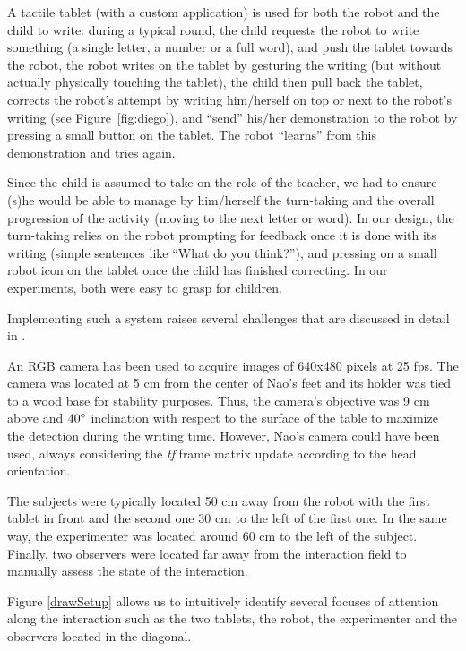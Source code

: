 \documentclass{sig-alternate}
\begin{document}
A tactile tablet (with a custom application) is used for both the robot and the child to write: during a typical round, the child requests the robot to write something (a single letter, a number or a full word), and push the tablet towards the robot, the robot writes on the tablet by gesturing the writing (but without actually physically touching the tablet), the child then pull back the
tablet, corrects the robot's attempt by writing him/herself on top or next to the robot's writing (see Figure~\ref{fig:diego}), and ``send'' his/her demonstration to the robot by pressing a small button on the tablet. The robot ``learns'' from this demonstration and tries again.

Since the child is assumed to take on the role of the teacher, we had to ensure (s)he would be able to manage by him/herself the turn-taking and the overall progression of the activity (moving to the next letter or word). In our design, the turn-taking relies on the robot prompting for feedback once it is done with its writing (simple sentences like ``What do you think?''), and pressing on a
small robot icon on the tablet once the child has finished correcting. In our experiments, both were easy to grasp for children.

Implementing such a system raises several challenges that are discussed in detail in \cite{Hood:2015}.

An RGB camera has been used to acquire images of 640x480 pixels at 25 fps. The camera was located at 5 cm from the center of Nao's feet and its holder was tied to a wood base for stability purposes. Thus, the camera's objective was 9 cm above and $ 40\degree $ inclination with respect to the surface of the table to maximize the detection during the writing time. However, Nao's camera could have been used, always considering the \textit{tf} frame matrix update according to the head orientation.

The subjects were typically located 50 cm away from the robot with the first tablet in front and the second one 30 cm to the left of the first one. In the same way, the experimenter was located around 60 cm to the left of the subject. Finally, two observers were located far away from the interaction field to manually assess the state of the interaction.

Figure \ref{drawSetup} allows us to intuitively identify several focuses of attention along the interaction such as the two tablets, the robot, the experimenter and the observers located in the diagonal.
\end{document}
